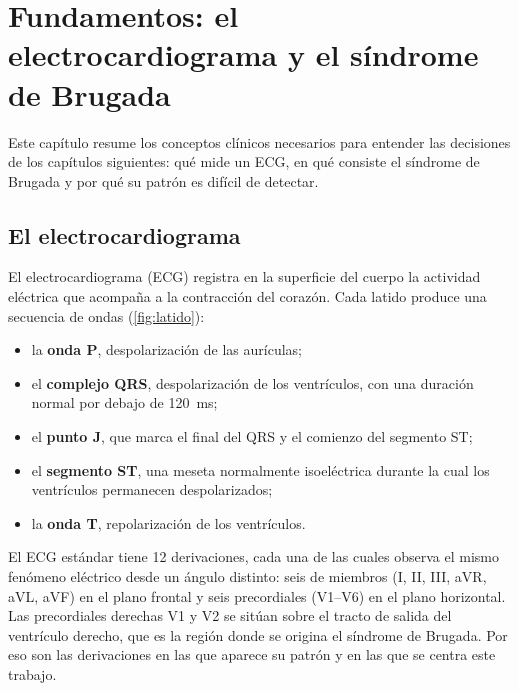\clearpage
\section{Fundamentos: el electrocardiograma y el síndrome de Brugada}\label{cap:fundamentos}

Este capítulo resume los conceptos clínicos necesarios para entender las decisiones de los capítulos siguientes: qué mide un ECG, en qué consiste el síndrome de Brugada y por qué su patrón es difícil de detectar.

\subsection{El electrocardiograma}

El electrocardiograma (ECG) registra en la superficie del cuerpo la actividad eléctrica que acompaña a la contracción del corazón. Cada latido produce una secuencia de ondas (\cref{fig:latido}):

\begin{itemize}
  \item la \textbf{onda P}, despolarización de las aurículas;
  \item el \textbf{complejo QRS}, despolarización de los ventrículos, con una duración normal por debajo de \SI{120}{\milli\second};
  \item el \textbf{punto J}, que marca el final del QRS y el comienzo del segmento ST;
  \item el \textbf{segmento ST}, una meseta normalmente isoeléctrica durante la cual los ventrículos permanecen despolarizados;
  \item la \textbf{onda T}, repolarización de los ventrículos.
\end{itemize}

El ECG estándar tiene 12 derivaciones, cada una de las cuales observa el mismo fenómeno eléctrico desde un ángulo distinto: seis de miembros (I, II, III, aVR, aVL, aVF) en el plano frontal y seis precordiales (V1--V6) en el plano horizontal. Las precordiales derechas V1 y V2 se sitúan sobre el tracto de salida del ventrículo derecho, que es la región donde se origina el síndrome de Brugada. Por eso son las derivaciones en las que aparece su patrón y en las que se centra este trabajo.

